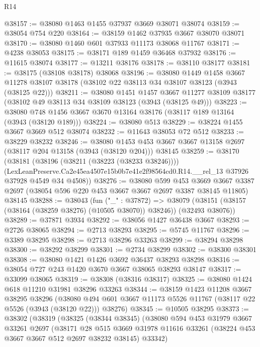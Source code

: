 \begin{lexlean}{R14}
\begin{coremodule}
@38157 := @38080 @1463 @1455 @37937 @3669 @38071 @38074
@38159 := @38054 @754 @220
@38164 := @38159 @1462 @37935 @3667 @38070 @38071
@38170 := @38080 @1460 @601 @37933 @11173 @38068 @11767
@38171 := @4238 @38053
@38175 := @38171 @189 @1459 @36468 @37932
@38176 := @11615 @38074
@38177 := @13211 @38176
@38178 := @38110 @38177
@38181 := @38175 (@38108 @38178) @38068
@38196 := @38080
    @1449
    @1458
    @3667
    @11278
    @38107
    @38178
    (@38102 @22 @38113 @34 @38107 @38123 (@3943 (@38125 @22)))
@38211 := @38080
    @1451
    @1457
    @3667
    @11277
    @38109
    @38177
    (@38102 @49 @38113 @34 @38109 @38123 (@3943 (@38125 @49)))
@38223 := @38080 @748 @1456 @3667 @3670 @13164 @38176 (@38117 @189 @13164 (@3943 (@38120 @189)))
@38224 := @38080 @513
@38229 := @38224 @1455 @3667 @3669 @512 @38074
@38232 := @11643 @38053 @72 @512
@38233 := @38229 @38232
@38246 := @38080
    @1453
    @453
    @3667
    @3667
    @13158
    @2697
    (@38117 @204 @13158 (@3943 (@38120 @204)))
    @38145
@38259 := @38170
    (@38181
      (@38196 (@38211 (@38223 (@38233 @38246))))
      (LexLeanPreserve.Ca2e45ea4507e15b0b7e41e2f98564cd0.R14.__rel_13
        @37926
        @37928
        @4549
        @34
        @4508))
@38276 := @38080
    @599
    @453
    @3669
    @3667
    @3387
    @2697
    (@38054 @596 @220 @453 @3667 @3667 @2697 @3387 @38145 @11805)
    @38145
@38288 := @38043
    (fun ("_" : @37872) =>
    @38079 (@38151 (@38157 (@38164 (@38259 @38276) (@10505 @38070)) @38246)) (@32493 @38076))
@38289 := @37871 @3934
@38292 := @38056 @1427 @36438 @3667
@38293 := @2726 @38065
@38294 := @2713 @38293
@38295 := @5745 @11767
@38296 := @3389 @38295
@38298 := @2713 @38296 @33263
@38299 := @38294 @38298
@38300 := @38292 @38299
@38301 := @2734 @38299
@38302 := @38300 @38301
@38308 := @38080 @1421 @1426 @3692 @36437 @38293 @38298
@38316 := @38054 @727 @243 @1420 @3670 @3667 @38065 @38293 @38147
@38317 := @33099 @38065
@38319 := @38308 (@38316 @38317)
@38325 := @38080 @1424 @618 @11210 @31981 @38296 @33263
@38344 := @38159
    @1423
    @11208
    @3667
    @38295
    @38296
    (@38080 @494 @601 @3667 @11173 @5526 @11767 (@38117 @22 @5526 (@3943 (@38120 @22))) @38276)
@38345 := @10505 @38295
@38373 := @38302
    (@38319
      (@38325
        (@38344 @38345)
        (@38080
          @594
          @453
          @31979
          @3667
          @33261
          @2697
          (@38171
            @28
            @515
            @3669
            @31978
            @11616
            @33261
            (@38224 @453 @3667 @3667 @512 @2697 @38232 @38145)
            @33342)

\end{coremodule}
\end{lexlean}
